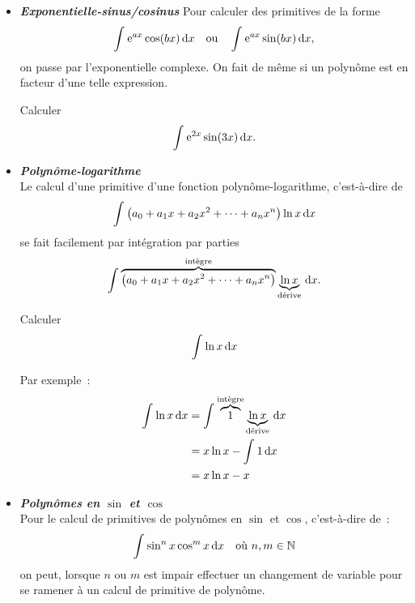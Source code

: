 \documentclass{magnolia}
\begin{document}
\begin{itemize}
\item \emph{\bf Exponentielle-sinus/cosinus}
  Pour calculer des primitives de la forme
  \[\int_{}^{} {\rm e}^{a x} \cos( bx)\,\text{d}x \quad\text{ou}\quad \int_{}^{} {\rm e}^{a x} \sin(bx)\,\text{d}x,\]
  on passe par l'exponentielle complexe. On fait de même si un polynôme est en facteur d'une telle expression.
  \begin{exoUnique}
  \exo Calculer
  \[\int_{}^{} {\rm e}^{2x} \sin(3x)\,\text{d}x.\]  
  \end{exoUnique}
\item \emph{\bf Polynôme-logarithme}\\
  Le calcul d'une primitive d'une fonction polynôme-logarithme, c'est-à-dire
  de
  $$\int_{}^{} \left(a_0+a_1 x+a_2 x^2+\dots+a_n x^n\right)\ln x\,\text{d}x$$
  se fait facilement par intégration par parties
  $$\int_{}^{} \overbrace{\left(a_0+a_1 x+a_2 x^2+\dots+a_n x^n\right)}^{\text{int\`egre}} \underbrace{\ln x}_{\text{d\'erive}}\,\text{d}x.$$
    \begin{exoUnique}
  \exo Calculer
  \[\int_{}^{} \ln x\,\text{d}x\]%
    \begin{sol}
  Par exemple~:
  \begin{equation*}
  \begin{split}
  \int_{}^{} \ln x\,\text{d}x&=\int_{}^{} \overbrace{1}^{\text{int\`egre}} \underbrace{\ln x}_{\text{d\'erive}}\,\text{d}x\\
                 &=x\ln x-\int_{}^{} 1\,\text{d}x\\
                 &=x\ln x-x
  \end{split}
  \end{equation*}
    \end{sol}
  \end{exoUnique}
\item \emph{\bf Polynômes en $\sin$ et $\cos$}\\
  Pour le calcul de primitives de polynômes en $\sin$ et $\cos$, c'est-à-dire
  de~:
  $$\int_{}^{} \sin^n x \cos^m x\,\text{d}x \quad \text{où $n,m\in\mathbb{N}$}$$
  on peut, lorsque $n$ ou $m$ est impair effectuer un changement de variable
  pour se ramener à un calcul de primitive de polynôme.

\end{itemize}
\end{document}
